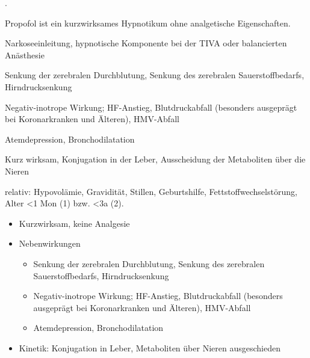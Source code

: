 {
\begin{MedikamentCharakteristika}
  \item[{\TxItemSpezialitaeten}] 
   .
  \item[Beschreibung] Propofol ist ein kurzwirksames Hypnotikum ohne 
  analgetische Eigenschaften. 
  \item[{\TxItemIndikation}] Narkoseeinleitung, hypnotische 
  Komponente bei der TIVA oder balancierten Anästhesie
  \item[Nebenwirkungen] Senkung der zerebralen Durchblutung, Senkung 
  des zerebralen Sauerstoffbedarfs, Hirndrucksenkung
  
  Negativ-inotrope Wirkung; HF-Anstieg, Blutdruckabfall (besonders 
  ausgeprägt bei 
  Koronarkranken und Älteren), HMV-Abfall
  
  Atemdepression, Bronchodilatation
  \item[Kinetik] Kurz wirksam, Konjugation in der Leber, Ausscheidung 
  der Metaboliten über die Nieren
  \item[{\TxItemKontraindikation}] relativ: Hypovolämie, Gravidität, 
  Stillen, Geburtshilfe,
  Fettstoffwechselstörung, Alter {\textless}1 Mon (1\PC*) bzw. 
  {\textless}3a (2\PC*).
  \item[{\TxItemDosierung}]
\end{MedikamentCharakteristika}}
{%
\begin{itemize}
  \item Kurzwirksam, keine Analgesie
  \item Nebenwirkungen
  \begin{itemize}
    \item {} Senkung der zerebralen Durchblutung, 
    Senkung des zerebralen Sauerstoffbedarfs, Hirndrucksenkung
    \item {} Negativ-inotrope Wirkung; 
    HF-Anstieg, 
    Blutdruckabfall (besonders ausgeprägt bei Koronarkranken und 
    Älteren), HMV-Abfall   
    \item {} Atemdepression, Bronchodilatation
  \end{itemize}
  \item Kinetik: Konjugation in Leber, Metaboliten über Nieren 
  ausgeschieden
\end{itemize}
}

